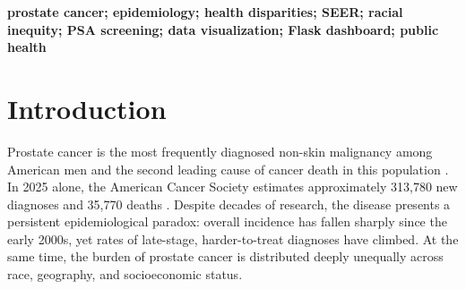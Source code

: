 \newpage

\begin{abstract}
Prostate cancer is the most commonly diagnosed non-skin cancer among American men,
yet survival outcomes differ dramatically based on race, geography, and stage of
diagnosis --- disparities that aggregate national statistics routinely obscure.
Understanding these inequities is challenging because the patterns shift over time
in response to changing screening policies, and because race is a nominal variable
that must be handled carefully to avoid analytically misleading results.
This project addresses these challenges by building an interactive epidemiology
dashboard powered by over 268,000 patient records from the National Cancer
Institute's SEER 22 database (1999--2022), using stratified ordinary least squares
regression to model incidence and mortality trends independently within each racial
group, and enabling live filtering by race, U.S.\ state, year range, and cancer
stage. The dashboard reveals three critical findings: national incidence declined
48\% following the 2012 USPSTF screening recommendation, but late-stage diagnoses
rose 50\% over the same period; Non-Hispanic Black men face 60\% higher incidence
and 109\% higher mortality than White men, a gap that persists after controlling for
age and stage; and a 62-percentage-point survival gap separates men diagnosed at the
localized stage from those diagnosed at the distant stage, a difference directly tied
to inequitable access to screening.
\end{abstract}

\vspace{1cm}

\begin{keywords}
\centering
\textbf{prostate cancer; epidemiology; health disparities; SEER; racial inequity;
PSA screening; data visualization; Flask dashboard; public health}
\end{keywords}

\newpage
\doublespacing
\tableofcontents
\singlespacing
\newpage
\doublespacing

\section{Introduction}

Prostate cancer is the most frequently diagnosed non-skin malignancy among American
men and the second leading cause of cancer death in this population \cite{siegel2023}.
In 2025 alone, the American Cancer Society estimates approximately 313,780 new
diagnoses and 35,770 deaths \cite{siegel2023}. Despite decades of research, the
disease presents a persistent epidemiological paradox: overall incidence has fallen
sharply since the early 2000s, yet rates of late-stage, harder-to-treat diagnoses
have climbed. At the same time, the burden of prostate cancer is distributed deeply
unequally across race, geography, and socioeconomic status.

